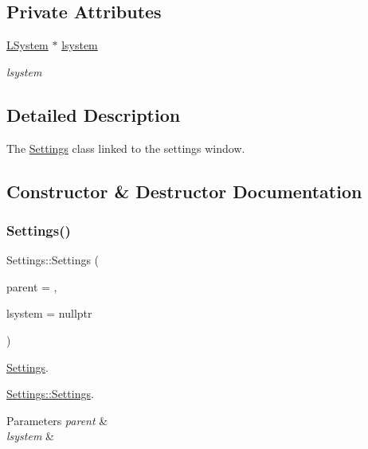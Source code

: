 \subsection*{Private Attributes}
\begin{DoxyCompactItemize}
\item 
\mbox{\label{classSettings_acf127d11a221e397e87f99bc49a268d4}} 
\hyperlink{classLSystem}{L\+System} $\ast$ \hyperlink{classSettings_acf127d11a221e397e87f99bc49a268d4}{lsystem}
\begin{DoxyCompactList}\small\item\em lsystem \end{DoxyCompactList}\end{DoxyCompactItemize}


\subsection{Detailed Description}
The \hyperlink{classSettings}{Settings} class linked to the settings window. 

\subsection{Constructor \& Destructor Documentation}
\mbox{\label{classSettings_a77888f988e8b0ae49f6785184fa33094}} 
\subsubsection{\texorpdfstring{Settings()}{Settings()}}
{\footnotesize\ttfamily Settings\+::\+Settings (\begin{DoxyParamCaption}\item[{Q\+Widget $\ast$}]{parent = {},  }\item[{\hyperlink{classLSystem}{L\+System} $\ast$}]{lsystem = {\ttfamily nullptr} }\end{DoxyParamCaption})\hspace{0.3cm}{\ttfamily [explicit]}}



\hyperlink{classSettings}{Settings}. 

\hyperlink{classSettings_a77888f988e8b0ae49f6785184fa33094}{Settings\+::\+Settings}.


\begin{DoxyParams}{Parameters}
{\em parent} & \\
\hline
{\em lsystem} & \\
\hline
\end{DoxyParams}


